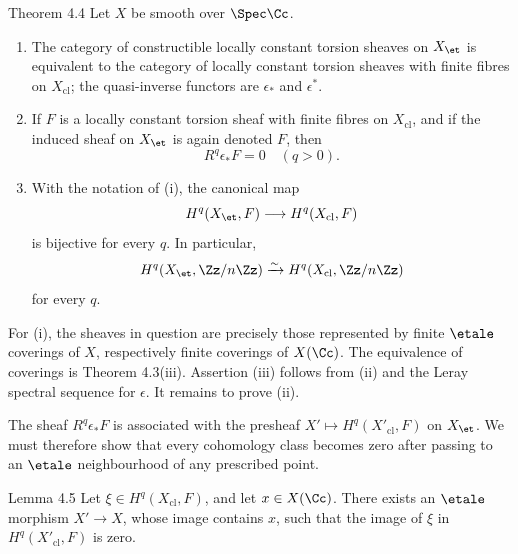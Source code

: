 \begin{statement}{Theorem 4.4}
Let \(X\) be smooth over \(\Spec\Cc\).
\begin{enumerate}[label=(\roman*)]
\item The category of constructible locally constant torsion sheaves on \(X_{\et}\) is equivalent to the category of locally constant torsion sheaves with finite fibres on \(X_{\mathrm{cl}}\); the quasi-inverse functors are \(\epsilon_*\) and \(\epsilon^*\).
\item If \(F\) is a locally constant torsion sheaf with finite fibres on \(X_{\mathrm{cl}}\), and if the induced sheaf on \(X_{\et}\) is again denoted \(F\), then
\[
R^q\epsilon_*F=0\quad(q>0).
\]
\item With the notation of (i), the canonical map
\[
H^q(X_{\et},F)\longrightarrow H^q(X_{\mathrm{cl}},F)
\]
is bijective for every \(q\). In particular,
\[
H^q(X_{\et},\Zz/n\Zz)\xrightarrow{\sim}H^q(X_{\mathrm{cl}},\Zz/n\Zz)
\]
for every \(q\).
\end{enumerate}
\end{statement}

\begin{prooftext}
For (i), the sheaves in question are precisely those represented by finite \(\etale\) coverings of \(X\), respectively finite coverings of \(X(\Cc)\). The equivalence of coverings is Theorem 4.3(iii). Assertion (iii) follows from (ii) and the Leray spectral sequence for \(\epsilon\). It remains to prove (ii).

The sheaf \(R^q\epsilon_*F\) is associated with the presheaf \(X'\mapsto H^q(X'_{\mathrm{cl}},F)\) on \(X_{\et}\). We must therefore show that every cohomology class becomes zero after passing to an \(\etale\) neighbourhood of any prescribed point.
\end{prooftext}

\begin{statement}{Lemma 4.5}
Let \(\xi\in H^q(X_{\mathrm{cl}},F)\), and let \(x\in X(\Cc)\). There exists an \(\etale\) morphism \(X'\to X\), whose image contains \(x\), such that the image of \(\xi\) in \(H^q(X'_{\mathrm{cl}},F)\) is zero.
\end{statement}

